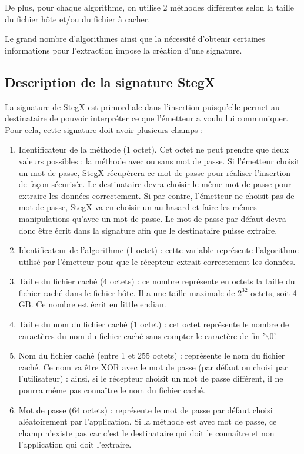 \documentclass[11pt]{article}
\begin{document}
De plus, pour chaque algorithme, on utilise 2 méthodes différentes selon 
la taille du fichier hôte et/ou du fichier à cacher. 

Le grand nombre d'algorithmes ainsi que la nécessité d'obtenir certaines 
informations pour l'extraction impose la création d'une signature. 

\subsection{Description de la signature StegX}

La signature de StegX est primordiale dans l'insertion puisqu'elle permet au 
destinataire de pouvoir interpréter ce que l'émetteur a voulu lui communiquer. 
Pour cela, cette signature doit avoir plusieurs champs : 
\begin {enumerate}
\item Identificateur de la méthode (1 octet). Cet octet ne 
peut prendre que deux valeurs possibles : la méthode avec ou sans mot de 
passe. Si l'émetteur choisit un mot de passe, StegX récupèrera ce mot de 
passe pour réaliser l'insertion de façon sécurisée. Le destinataire devra 
choisir le même mot de passe pour extraire les données correctement. 
Si par contre, l'émetteur ne choisit pas de mot de passe, StegX va en choisir 
un au hasard et faire les mêmes manipulations qu'avec un mot de passe. 
Le mot de passe par défaut devra donc être écrit dans la signature afin que 
le destinataire puisse extraire. 
\item Identificateur de l'algorithme (1 octet) : cette variable représente 
l'algorithme utilisé par l'émetteur pour que le récepteur extrait correctement 
les données. 
\item Taille du fichier caché (4 octets) : ce nombre représente en octets 
la taille du fichier caché dans le fichier hôte. Il a une taille maximale 
de $2^{32}$ octets, soit 4 GB. Ce nombre est écrit en little endian. 
\item Taille du nom du fichier caché (1 octet) : cet octet représente le 
nombre de caractères du nom du fichier caché sans compter le caractère de 
fin '$\backslash$0'.
\item Nom du fichier caché (entre 1 et 255 octets) : représente le nom du 
fichier caché. Ce nom va être XOR avec le mot de passe (par défaut ou choisi
par l'utilisateur) : ainsi, si le récepteur choisit un mot de passe différent, 
il ne pourra même pas connaître le nom du fichier caché. 
\item Mot de passe (64 octets) : représente le mot de passe par défaut choisi 
aléatoirement par l'application. Si la méthode est avec mot de passe, 
ce champ n'existe pas car c'est le destinataire qui doit le connaître et 
non l'application qui doit l'extraire. 
\end{enumerate}
\end{document}
